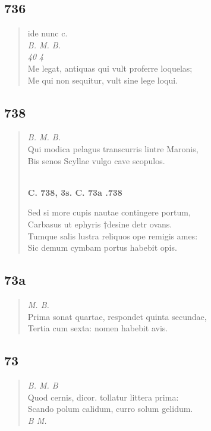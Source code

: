 \documentclass[11pt, a4paper]{report}
\begin{document}
            \subsection*{736}
      \begin{verse}
      ide nunc c. \\ \textit{B. M. B.} \\ \textit{40 4} \\ Me legat, antiquas qui vult proferre loquelas; \\ Me qui non sequitur, vult sine lege loqui. \\ 
      \end{verse}
  
            \subsection*{738}
      \begin{verse}
      \textit{B. M. B.} \\ Qui modica pelagus transcurris lintre Maronis, \\ Bis senos Scyllae vulgo cave scopulos. \\ 
        ﻿\pagebreak 
     \marginpar{[220]} \begin{center} \textbf{C. 738, 3s. C. 73a .738} \end{center}Sed si more cupis nautae contingere portum, \\ Carbasus ut ephyris †desine detr ovans. \\ Tumque salis lustra reliquos ope remigis ames: \\ Sic demum cymbam portus habebit opis. \\ 
      \end{verse}
  
            \subsection*{73a}
      \begin{verse}
      \textit{M. B.} \\ Prima sonat quartae, respondet quinta secundae, \\ Tertia cum sexta: nomen habebit avis. \\ 
      \end{verse}
  
            \subsection*{73}
      \begin{verse}
      \textit{B. M. B} \\ Quod cernis, dicor. tollatur littera prima: \\ Scando polum calidum, curro solum gelidum. \\ 
        ﻿\pagebreak 
        ﻿\pagebreak 
    \textit{B M.} \\ 
      \end{verse}
  
\end{document}
